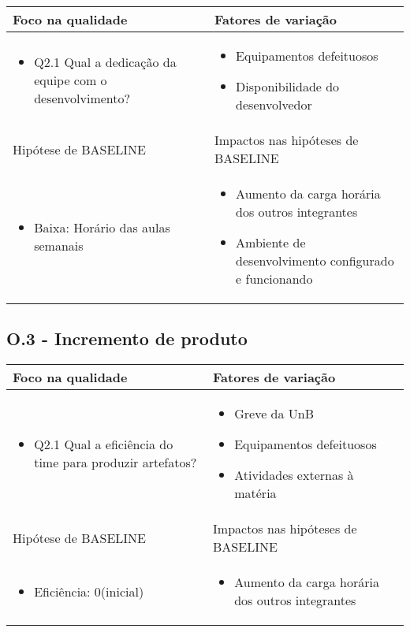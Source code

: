	\begin{tabular}{ |p{4cm}|p{6cm}|  }
	 \hline
	 Foco na qualidade 		& 		Fatores de variação \\
	 \hline
	 \begin{itemize} \item Q2.1 Qual a dedicação da equipe com o desenvolvimento? \end{itemize} & \begin{itemize} \item Equipamentos defeituosos \item Disponibilidade do desenvolvedor \end{itemize}\\
	 \hline
	 Hipótese de BASELINE 		& 		Impactos nas hipóteses de BASELINE \\
	 \hline
	 \begin{itemize} \item Baixa: Horário das aulas semanais  \end{itemize} 		& 		\begin{itemize} \item Aumento da carga horária dos outros integrantes 
	 \item Ambiente de desenvolvimento configurado e funcionando \end{itemize} \\
	 \hline
	\end{tabular}

\subsection{O.3 - Incremento de produto}

	\begin{tabular}{ |p{6cm}|p{6cm}|  }
	 \hline
	 Foco na qualidade 		& 		Fatores de variação \\
	 \hline
	 \begin{itemize} \item Q2.1 Qual a eficiência do time para produzir artefatos? \end{itemize} & \begin{itemize} \item Greve da UnB \item Equipamentos defeituosos \item Atividades externas à matéria \end{itemize}\\
	 \hline
	 Hipótese de BASELINE 		& 		Impactos nas hipóteses de BASELINE \\
	 \hline
	 \begin{itemize} \item Eficiência: 0(inicial) \end{itemize} & \begin{itemize} \item Aumento da carga horária dos outros integrantes \end{itemize} \\
	 \hline
	\end{tabular}
